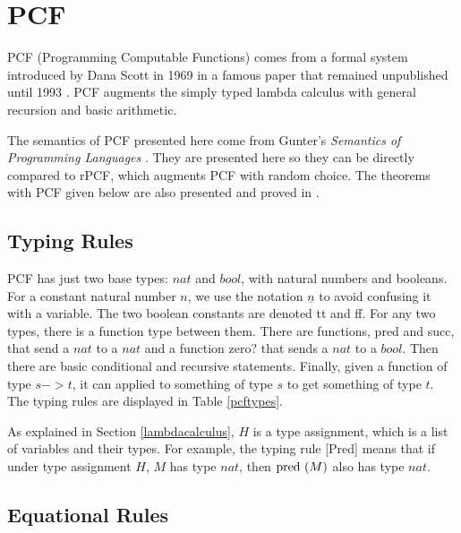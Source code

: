 
\reservestyle{\command}{\textbf}

\section{PCF}

PCF (Programming Computable Functions) comes from a formal system introduced by Dana Scott in 1969 in a famous paper that remained unpublished until 1993 \cite{scott1993type}.  PCF augments the simply typed lambda calculus with general recursion and basic arithmetic.

The semantics of PCF presented here come from Gunter's \emph{Semantics of Programming Languages} \cite{gunter1992semantics}.  They are presented here so they can be directly compared to rPCF, which augments PCF with random choice.  The theorems with PCF given below are also presented and proved in \cite{gunter1992semantics}.

\subsection{Typing Rules}

PCF has just two base types: $nat$ and $bool$, with natural numbers and booleans.  For a constant natural number $n$, we use the notation $\underline{n}$ to avoid confusing it with a variable.  The two boolean constants are denoted tt and ff.  For any two types, there is a function type between them.  There are functions, pred and succ, that send a $nat$ to a $nat$ and a function zero? that sends a $nat$ to a $bool$.  Then there are basic conditional and recursive statements.  Finally, given a function of type $s->t$, it can applied to something of type $s$ to get something of type $t$.  The typing rules are displayed in Table \ref{pcftypes}.

As explained in Section \ref{lambdacalculus}, $H$ is a type assignment, which is a list of variables and their types.  For example, the typing rule [Pred] means that if under type assignment $H$, $M$ has type $nat$, then $\textrm{pred }(M)$ also has type $nat$.

\subsection{Equational Rules}

